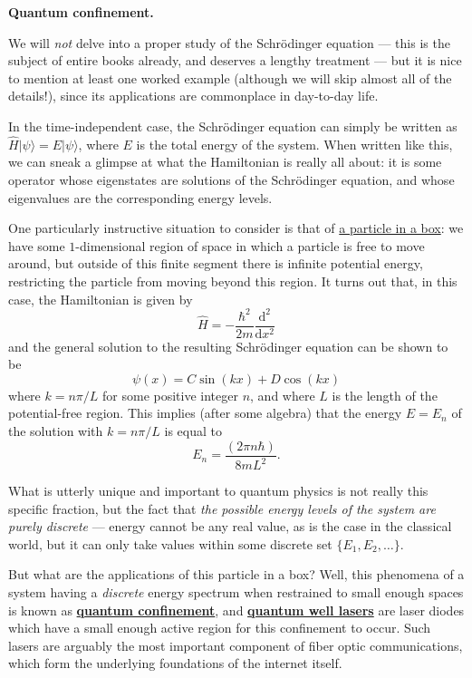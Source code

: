 \documentclass[fleqn,a4paper]{article}
\newenvironment{technical}[1]{\textbf{#1.}\par\vspace{.5\baselineskip}\everypar{\setlength{\parindent}{1.5em}}}{}
\theoremstyle{definition}
\theoremstyle{definition}
\theoremstyle{definition}
\theoremstyle{definition}
\theoremstyle{remark}
\begin{document}
\begin{technical}{Quantum confinement}
We will \emph{not} delve into a proper study of the Schrödinger equation --- this is the subject of entire books already, and deserves a lengthy treatment --- but it is nice to mention at least one worked example (although we will skip almost all of the details!), since its applications are commonplace in day-to-day life.

In the time-independent case, the Schrödinger equation can simply be written as \(\hat{H}|\psi\rangle=E|\psi\rangle\), where \(E\) is the total energy of the system.
When written like this, we can sneak a glimpse at what the Hamiltonian is really all about: it is some operator whose eigenstates are solutions of the Schrödinger equation, and whose eigenvalues are the corresponding energy levels.

One particularly instructive situation to consider is that of \href{https://en.wikipedia.org/wiki/Particle_in_a_box}{a particle in a box}: we have some \(1\)-dimensional region of space in which a particle is free to move around, but outside of this finite segment there is infinite potential energy, restricting the particle from moving beyond this region.
It turns out that, in this case, the Hamiltonian is given by
\[
  \hat{H} = -\frac{\hbar^2}{2m}\frac{\mathrm{d}^2}{\mathrm{d}x^2}
\]
and the general solution to the resulting Schrödinger equation can be shown to be
\[
  \psi(x) = C\sin(kx)+D\cos(kx)
\]
where \(k=n\pi/L\) for some positive integer \(n\), and where \(L\) is the length of the potential-free region.
This implies (after some algebra) that the energy \(E=E_n\) of the solution with \(k=n\pi/L\) is equal to
\[
  E_n = \frac{(2\pi n\hbar)}{8mL^2}.
\]

What is utterly unique and important to quantum physics is not really this specific fraction, but the fact that \emph{the possible energy levels of the system are purely discrete} --- energy cannot be any real value, as is the case in the classical world, but it can only take values within some discrete set \(\{E_1,E_2,\ldots\}\).

But what are the applications of this particle in a box?
Well, this phenomena of a system having a \emph{discrete} energy spectrum when restrained to small enough spaces is known as \href{https://en.wikipedia.org/wiki/Quantum_confinement}{\textbf{quantum confinement}}, and \href{https://en.wikipedia.org/wiki/Quantum_well_laser}{\textbf{quantum well lasers}} are laser diodes which have a small enough active region for this confinement to occur.
Such lasers are arguably the most important component of fiber optic communications, which form the underlying foundations of the internet itself.

\end{technical}
\end{document}
